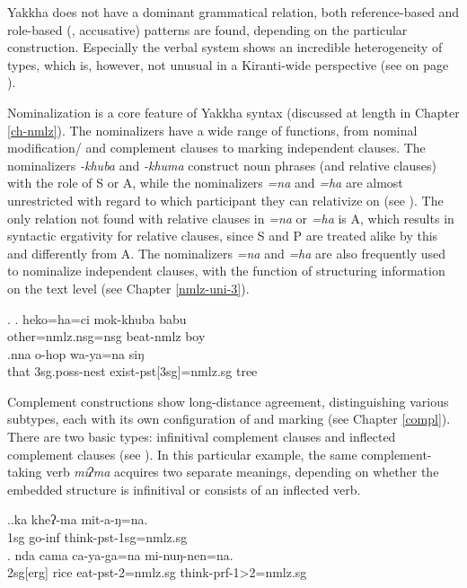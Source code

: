 Yakkha does not have a dominant grammatical relation, both reference-based and role-based (, accusative)  patterns are found, depending on the particular construction. Especially the verbal  system shows an incredible heterogeneity of  types, which is, however, not unusual in a Kiranti-wide perspective (see  on page \pageref{aligntables}). 

Nominalization is a core feature of Yakkha syntax (discussed at length in Chapter \ref{ch-nmlz}). The nominalizers have a wide range of functions, from nominal modification/ and complement clauses to marking independent clauses. The nominalizers \emph{-khuba} and \emph{-khuma} construct noun phrases (and relative clauses) with the role of S or A, while the nominalizers \emph{=na} and \emph{=ha} are almost unrestricted with regard to which participant they can relativize on (see \Next). The only relation not found with relative clauses in \emph{=na} or \emph{=ha} is A, which results in syntactic ergativity for relative clauses, since S and P are treated alike by this  and differently from A.
The nominalizers \emph{=na} and \emph{=ha} are also frequently used to nominalize independent clauses, with the function of structuring information  on the text level (see Chapter \ref{nmlz-uni-3}). 

\ex. \ag.   heko=ha=ci mok-khuba babu\\
			other{\sc =nmlz.nsg=nsg} beat{\sc -nmlz} boy\\
\bg.nna  o-hop wa-ya=na siŋ\\
		that {\sc 3sg.poss}-nest exist-{\sc pst[3sg]=nmlz.sg} tree\\
	

Complement constructions show long-distance agreement, distinguishing various subtypes, each with its own configuration of  and  marking (see Chapter \ref{compl}). There are two basic types: infinitival complement clauses and inflected complement clauses (see \Next). In this particular example, the same comple\-ment-taking verb \emph{miʔma} acquires two separate meanings, depending on whether the embedded structure is infinitival or consists of an inflected verb.

\ex.\ag.ka kheʔ-ma mit-a-ŋ=na.\\
{\sc 1sg} go{\sc -inf} think{\sc -pst-1sg=nmlz.sg}\\
\bg. nda cama ca-ya-ga=na mi-nuŋ-nen=na.\\
{\sc 2sg[erg]} rice eat-{\sc pst-2=nmlz.sg} think-{\sc prf-1>2=nmlz.sg}\\


